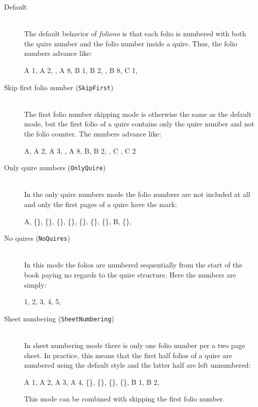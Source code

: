 \documentclass[a4paper, 12pt]{article}
\newcommand{\feature}[1]{\texttt{#1}}
\begin{document}
\begin{description}
\item [Default] \mbox{} \\
  The default behavior of \emph{foliono} is that each folio is
  numbered with both the quire number and the folio number inside a
  quire. Thus, the folio numbers advance like:
  \begin{center}
    A 1, A 2, \textellipsis, A 8, B 1, B 2, \textellipsis, B 8, C 1, \textellipsis
  \end{center}
  
\item [Skip first folio number (\feature{SkipFirst})] \mbox{} \\
  The first folio number skipping mode is otherwise the same as the
  default mode, but the first folio of a quire contains only the quire
  number and not the folio counter. The numbers advance like:
  \begin{center}
    A, A 2, A 3, \textellipsis, A 8, B, B 2, \textellipsis, C , C 2 \textellipsis
  \end{center}


  
\item [Only quire numbers (\feature{OnlyQuire})] \mbox{}\\
  In the only quire numbers mode the folio numbers are not included
  at all and only the first pages of a quire have the mark:
  \begin{center}
    A, \{\}, \{\}, \{\}, \{\}, \{\}, \{\}, \{\}, B, \{\}, \textellipsis
  \end{center}
  
\item [No quires (\feature{NoQuires})]\mbox{} \\
  In this mode the folios are numbered sequentially from the start of
  the book paying no regards to the quire structure. Here the numbers
  are simply:
  \begin{center}
    1, 2, 3, 4, 5, \textellipsis
  \end{center}

\item [Sheet numbering (\feature{SheetNumbering})] \mbox{}\\
  In sheet numbering mode there is only one folio number per a two
  page sheet. In practice, this means that the first half folios of a
  quire are numbered using the default style and the latter half are
  left unnumbered:
  \begin{center}
    A 1, A 2, A 3, A 4, \{\}, \{\}, \{\}, \{\}, B 1, B 2, \textellipsis
  \end{center}
  This mode can be combined with skipping the first folio number. 



\end{description}
\end{document}
